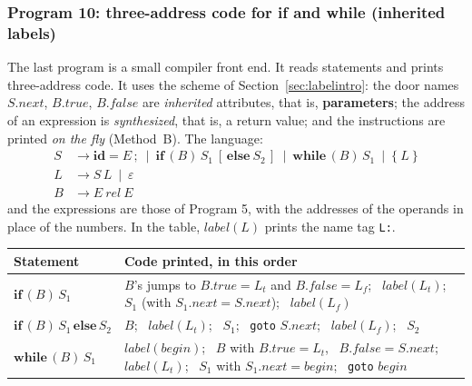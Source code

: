 \documentclass[11pt,a4paper]{article}
\newcommand{\tok}[1]{\ensuremath{\mathtt{#1}}}
\begin{document}
\subsubsection*{Program 10: three-address code for \textbf{if} and \textbf{while} (inherited labels)}
The last program is a small compiler front end. It reads statements and prints three-address code. It uses the scheme of Section~\ref{sec:labelintro}: the door names $S.next$, $B.true$, $B.false$ are \emph{inherited} attributes, that is, \textbf{parameters}; the address of an expression is \emph{synthesized}, that is, a return value; and the instructions are printed \emph{on the fly} (Method~B). The language:
\begin{align*}
S &\to \mathbf{id} = E\,;\ \mid\ \mathbf{if}\,(B)\,S_1\ [\,\mathbf{else}\ S_2\,]\ \mid\ \mathbf{while}\,(B)\,S_1\ \mid\ \tok{\{}\ L\ \tok{\}}\\
L &\to S\,L\ \mid\ \varepsilon\\
B &\to E\ \mathit{rel}\ E
\end{align*}
and the expressions are those of Program 5, with the addresses of the operands in place of the numbers. In the table, $\mathit{label}(L)$ prints the name tag \texttt{L:}.
\begin{center}
\small
\begin{tabular}{@{}l p{9.6cm}@{}}
\toprule
\textbf{Statement} & \textbf{Code printed, in this order} \\ \midrule
$\mathbf{if}\,(B)\,S_1$ & $B$'s jumps to $B.true=L_t$ and $B.false=L_f$; \ $\mathit{label}(L_t)$; \ $S_1$ (with $S_1.next=S.next$); \ $\mathit{label}(L_f)$ \\[3pt]
$\mathbf{if}\,(B)\,S_1\,\mathbf{else}\,S_2$ & $B$; \ $\mathit{label}(L_t)$; \ $S_1$; \ \texttt{goto} $S.next$; \ $\mathit{label}(L_f)$; \ $S_2$ \\[3pt]
$\mathbf{while}\,(B)\,S_1$ & $\mathit{label}(\mathit{begin})$; \ $B$ with $B.true=L_t$, \ $B.false=S.next$; \ $\mathit{label}(L_t)$; \ $S_1$ with $S_1.next=\mathit{begin}$; \ \texttt{goto} $\mathit{begin}$ \\ \bottomrule
\end{tabular}
\end{center}
\end{document}

